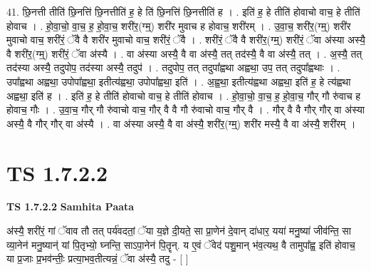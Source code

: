 \documentclass[17pt]{extarticle}
\begin{document}
41. छि॒नत्ती तीति॑ छि॒नत्ति॑ छि॒नत्तीति॑ ह॒ हे ति॑ छि॒नत्ति॑ छि॒नत्तीति॑ ह । . इति॑ ह॒ हे तीति॑ होवाचो वाच॒ हे तीति॑ होवाच । . हो॒वा॒चो॒ वा॒च॒ ह॒ हो॒वा॒च॒ शरी॑र॒(ग्म्॒) शरी॑र मुवाच ह होवाच॒ शरी॑रम् । . उ॒वा॒च॒ शरी॑र॒(ग्म्॒) शरी॑र मुवाचो वाच॒ शरी॑रं॒ ॅवै वै शरी॑र मुवाचो वाच॒ शरी॑रं॒ ॅवै । . शरी॑रं॒ ॅवै वै शरी॑र॒(ग्म्॒) शरी॑रं॒ ॅवा अ॑स्या अस्यै॒ वै शरी॑र॒(ग्म्॒) शरी॑रं॒ ॅवा अ॑स्यै । . वा अ॑स्या अस्यै॒ वै वा अ॑स्यै॒ तत् तद॑स्यै॒ वै वा अ॑स्यै॒ तत् । . अ॒स्यै॒ तत् तद॑स्या अस्यै॒ तदुपोप॒ तद॑स्या अस्यै॒ तदुप॑ । . तदुपोप॒ तत् तदुपा᳚ह्वथा अह्वथा॒ उप॒ तत् तदुपा᳚ह्वथाः । . उपा᳚ह्वथा अह्वथा॒ उपोपा᳚ह्वथा॒ इतीत्य॑ह्वथा॒ उपोपा᳚ह्वथा॒ इति॑ । . अ॒ह्व॒था॒ इतीत्य॑ह्वथा अह्वथा॒ इति॑ ह॒ हे त्य॑ह्वथा अह्वथा॒ इति॑ ह । . इति॑ ह॒ हे तीति॑ होवाचो वाच॒ हे तीति॑ होवाच । . हो॒वा॒चो॒ वा॒च॒ ह॒ हो॒वा॒च॒ गौर् गौ रु॑वाच ह होवाच॒ गौः । . उ॒वा॒च॒ गौर् गौ रु॑वाचो वाच॒ गौर् वै वै गौ रु॑वाचो वाच॒ गौर् वै । . गौर् वै वै गौर् गौर् वा अ॑स्या अस्यै॒ वै गौर् गौर् वा अ॑स्यै । . वा अ॑स्या अस्यै॒ वै वा अ॑स्यै॒ शरी॑र॒(ग्म्॒) शरी॑र मस्यै॒ वै वा अ॑स्यै॒ शरी॑रम् । \newline
\pagebreak
{}

\section{ TS 1.7.2.2 }

\textbf{TS 1.7.2.2 } \newline
\textbf{Samhita Paata} \newline

अ॑स्यै॒ शरी॑रं॒ गां ॅवाव तौ तत् पर्य॑वदतां॒ ॅया य॒ज्ञे दी॒यते॒ सा प्रा॒णेन॑ दे॒वान् दा॑धार॒ यया॑ मनु॒ष्या॑ जीव॑न्ति॒ सा व्या॒नेन॑ मनु॒ष्यान्॑ यां पि॒तृभ्यो॒ घ्नन्ति॒ साऽपा॒नेन॑ पि॒तॄन्. य ए॒वं ॅवेद॑ पशु॒मान् भ॑व॒त्यथ॒ वै तामुपा᳚ह्व॒ इति॑ होवाच॒ या प्र॒जाः प्र॒भव॑न्तीः॒ प्रत्या॒भव॒तीत्यन्नं॒ ॅवा अ॑स्यै॒ तदु - [ ] \newline
\end{document}
